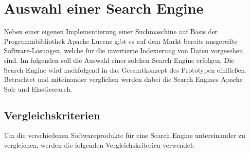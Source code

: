 \section{Auswahl einer Search Engine\label{sec4.2:Unterpunkt-2}}

Neben einer eigenen Implementierung einer Suchmaschine auf Basis der Programmbibliothek \glqq Apache Lucene\grqq{} gibt es auf dem Markt bereits ausgereifte Software-Lösungen, welche für die invertierte Indexierung von Daten vorgesehen sind. Im folgenden soll die Auswahl einer solchen Search Engine erfolgen. Die Search Engine wird nachfolgend in das Gesamtkonzept des Prototypen einfließen. Betrachtet und miteinander verglichen werden dabei die Search Engines \glqq Apache Solr\grqq{} und \glqq Elasticsearch\grqq{}.

\subsection{Vergleichskriterien\label{subsec4.2.1:Unterunterpunkt-1}}

Um die verschiedenen Softwareprodukte für eine Search Engine untereinander zu vergleichen, werden die folgenden Vergleichskriterien verwendet:

